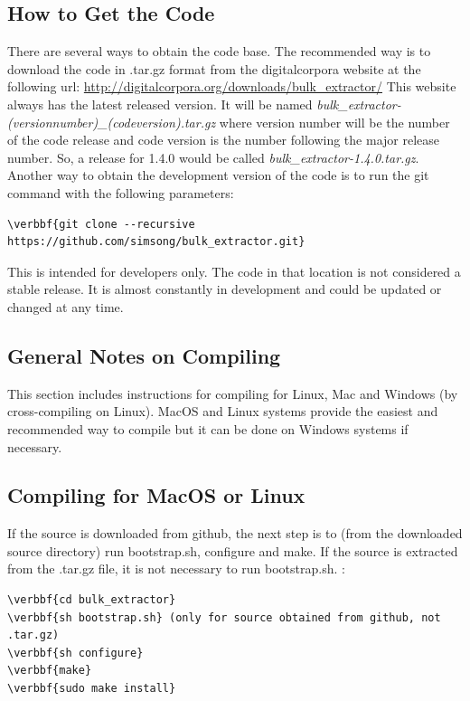 \documentclass[11pt,fleqn]{article} %
\begin{document}
\subsection{How to Get the Code}
There are several ways to obtain the \bulk code base. The recommended way is to download the code in .tar.gz format from the digitalcorpora website at the following url:
\url{http://digitalcorpora.org/downloads/bulk_extractor/} 
This website always has the latest released version. It will be named \textit{bulk\_extractor-(versionnumber)\_(codeversion).tar.gz} where version number will be the number of the code release and code version is the number following the major release number. So, a release for 1.4.0 would be called \textit{bulk\_extractor-1.4.0.tar.gz}. \\

Another way to obtain the development version of the code is to run the git command with the following parameters: 
\begin{Verbatim}[commandchars=\\\{\}]
\verbbf{git clone --recursive https://github.com/simsong/bulk_extractor.git}
\end{Verbatim}

This is intended for \bulk developers only. The code in that location is not considered a stable release. It is almost constantly in development and could be updated or changed at any time. 

\subsection{General Notes on Compiling}
This section includes instructions for compiling \bulk for Linux, Mac and Windows (by cross-compiling on Linux). MacOS and Linux systems provide the easiest and recommended way to compile \bulk but it can be done on Windows systems if necessary.


\subsection{Compiling for MacOS or Linux}

\lstset{basicstyle=\footnotesize\ttfamily,breaklines=true}
If the source is downloaded from github, the next step is to (from the downloaded source directory) run bootstrap.sh, configure and make. If the source is extracted from the .tar.gz file, it is not necessary to run bootstrap.sh. :
\begin{Verbatim}[commandchars=\\\{\}] 
\verbbf{cd bulk_extractor}
\verbbf{sh bootstrap.sh} (only for source obtained from github, not .tar.gz)
\verbbf{sh configure}
\verbbf{make} 
\verbbf{sudo make install}
\end{Verbatim}
\end{document}
